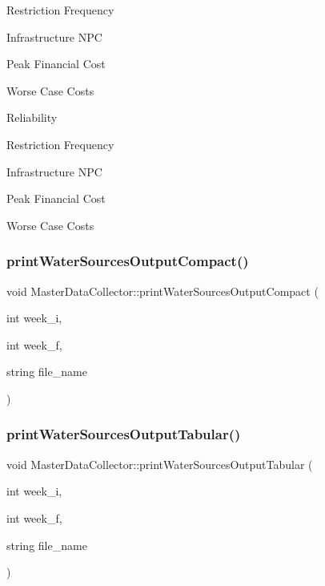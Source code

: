 Restriction Frequency

Infrastructure N\+PC

Peak Financial Cost

Worse Case Costs

Reliability

Restriction Frequency

Infrastructure N\+PC

Peak Financial Cost

Worse Case Costs \mbox{\label{classMasterDataCollector_adbe50e49689078e64a28450087ad0961}} 
\subsubsection{\texorpdfstring{print\+Water\+Sources\+Output\+Compact()}{printWaterSourcesOutputCompact()}}
{\footnotesize\ttfamily void Master\+Data\+Collector\+::print\+Water\+Sources\+Output\+Compact (\begin{DoxyParamCaption}\item[{int}]{week\+\_\+i,  }\item[{int}]{week\+\_\+f,  }\item[{string}]{file\+\_\+name }\end{DoxyParamCaption})}

\mbox{\label{classMasterDataCollector_a77dd707b686d936118cd4e940156754f}} 
\subsubsection{\texorpdfstring{print\+Water\+Sources\+Output\+Tabular()}{printWaterSourcesOutputTabular()}}
{\footnotesize\ttfamily void Master\+Data\+Collector\+::print\+Water\+Sources\+Output\+Tabular (\begin{DoxyParamCaption}\item[{int}]{week\+\_\+i,  }\item[{int}]{week\+\_\+f,  }\item[{string}]{file\+\_\+name }\end{DoxyParamCaption})}

